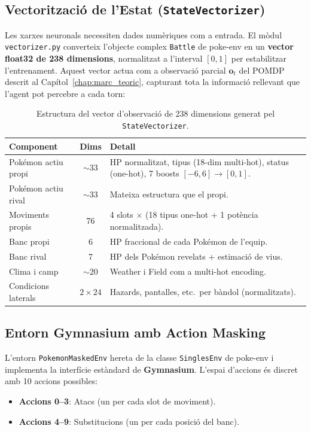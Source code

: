 \subsection{Vectorització de l'Estat (\texttt{StateVectorizer})}

Les xarxes neuronals necessiten dades numèriques com a entrada. El mòdul \texttt{vectorizer.py} converteix l'objecte complex \texttt{Battle} de poke-env en un \textbf{vector float32 de 238 dimensions}, normalitzat a l'interval $[0, 1]$ per estabilitzar l'entrenament. Aquest vector actua com a observació parcial $\mathbf{o}_t$ del POMDP descrit al Capítol~\ref{chap:marc_teoric}, capturant tota la informació rellevant que l'agent pot percebre a cada torn:

\begin{table}[H]
    \centering
    \small
    \begin{tabular}{|l|c|p{7cm}|}
    \hline
    \textbf{Component} & \textbf{Dims} & \textbf{Detall} \\ \hline
    Pokémon actiu propi & $\sim$33 & HP normalitzat, tipus (18-dim multi-hot), status (one-hot), 7 boosts $[-6,6] \rightarrow [0,1]$. \\ \hline
    Pokémon actiu rival & $\sim$33 & Mateixa estructura que el propi. \\ \hline
    Moviments propis & 76 & 4 slots $\times$ (18 tipus one-hot + 1 potència normalitzada). \\ \hline
    Banc propi & 6 & HP fraccional de cada Pokémon de l'equip. \\ \hline
    Banc rival & 7 & HP dels Pokémon revelats + estimació de vius. \\ \hline
    Clima i camp & $\sim$20 & Weather i Field com a multi-hot encoding. \\ \hline
    Condicions laterals & $2 \times 24$ & Hazards, pantalles, etc.\ per bàndol (normalitzats). \\ \hline
    \end{tabular}
    \caption{Estructura del vector d'observació de 238 dimensions generat pel \texttt{StateVectorizer}.}
    \label{tab:vectorizer}
\end{table}

\subsection{Entorn Gymnasium amb Action Masking}

L'entorn \texttt{PokemonMaskedEnv} hereta de la classe \texttt{SinglesEnv} de poke-env i implementa la interfície estàndard de \textbf{Gymnasium}. L'espai d'accions és discret amb 10 accions possibles:
\begin{itemize}
    \item \textbf{Accions 0--3}: Atacs (un per cada slot de moviment).
    \item \textbf{Accions 4--9}: Substitucions (un per cada posició del banc).
\end{itemize}

